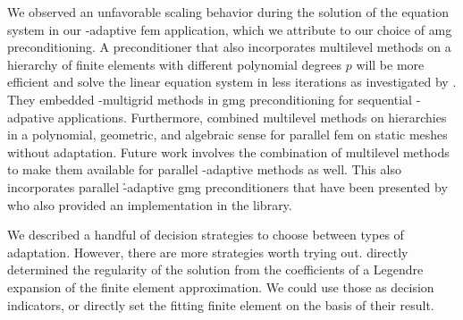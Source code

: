 We observed an unfavorable scaling behavior during the solution of the equation system in our \hp-adaptive \gls{fem} application, which we attribute to our choice of \gls{amg} preconditioning. A preconditioner that also incorporates multilevel methods on a hierarchy of finite elements with different polynomial degrees $p$ will be more efficient and solve the linear equation system in less iterations as investigated by \textcite{mitchell2010}. They embedded \p-multigrid methods in \gls{gmg} preconditioning for sequential \hp-adpative applications. Furthermore, \textcite{fehn2019} combined multilevel methods on hierarchies in a polynomial, geometric, and algebraic sense for parallel \gls{fem} on static meshes without adaptation. Future work involves the combination of multilevel methods to make them available for parallel \hp-adaptive methods as well.
This also incorporates parallel \h-adaptive \gls{gmg} preconditioners that have been presented by \textcite{clevenger2019} who also provided an implementation in the \dealii{} library.



We described a handful of decision strategies to choose between types of adaptation. However, there are more strategies worth trying out.
\textcite{houston2003,houston2005} directly determined the regularity of the solution from the coefficients of a Legendre expansion of the finite element approximation. We could use those as decision indicators, or directly set the fitting finite element on the basis of their result.

